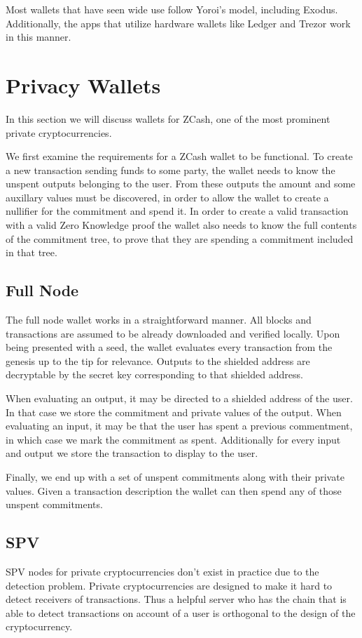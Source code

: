 \documentclass[sigconf,authordraft]{acmart}
\begin{document}
Most wallets that have seen wide use follow Yoroi's model, including Exodus. Additionally, the apps that utilize hardware wallets like Ledger and Trezor work in this manner.

\section{Privacy Wallets}
In this section we will discuss wallets for ZCash, one of the most prominent private cryptocurrencies.

We first examine the requirements for a ZCash wallet to be functional. To create a new transaction sending funds to some party, the wallet needs to know the unspent outputs belonging to the user. From these outputs the amount and some auxillary values must be discovered, in order to allow the wallet to create a nullifier for the commitment and spend it. In order to create a valid transaction with a valid Zero Knowledge proof the wallet also needs to know the full contents of the commitment tree, to prove that they are spending a commitment included in that tree.

\subsection{Full Node}
The full node wallet works in a straightforward manner. All blocks and transactions are assumed to be already downloaded and verified locally. Upon being presented with a seed, the wallet evaluates every transaction from the genesis up to the tip for relevance. Outputs to the shielded address are decryptable by the secret key corresponding to that shielded address.

When evaluating an output, it may be directed to a shielded address of the user. In that case we store the commitment and private values of the output. When evaluating an input, it may be that the user has spent a previous commentment, in which case we mark the commitment as spent. Additionally for every input and output we store the transaction to display to the user.

Finally, we end up with a set of unspent commitments along with their private values. Given a transaction description the wallet can then spend any of those unspent commitments.

\subsection{SPV}
SPV nodes for private cryptocurrencies don't exist in practice due to the detection problem. Private cryptocurrencies are designed to make it hard to detect receivers of transactions. Thus a helpful server who has the chain that is able to detect transactions on account of a user is orthogonal to the design of the cryptocurrency.
\end{document}
